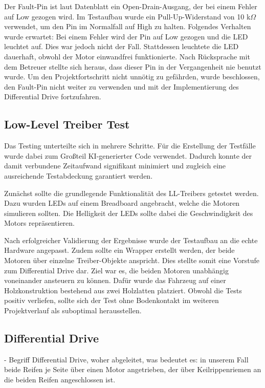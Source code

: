 Der Fault-Pin ist laut Datenblatt ein Open-Drain-Ausgang, der bei einem Fehler auf Low gezogen wird. Im Testaufbau wurde ein Pull-Up-Widerstand von 10 k$\Omega$ verwendet, um den Pin im Normalfall auf High zu halten. Folgendes Verhalten wurde erwartet: Bei einem Fehler wird der Pin auf Low gezogen und die LED leuchtet auf. Dies war jedoch nicht der Fall. Stattdessen leuchtete die LED dauerhaft, obwohl der Motor einwandfrei funktionierte. Nach Rücksprache mit dem Betreuer stellte sich heraus, dass dieser Pin in der Vergangenheit nie benutzt wurde. Um den Projektfortschritt nicht unnötig zu gefährden, wurde beschlossen, den Fault-Pin nicht weiter zu verwenden und mit der Implementierung des Differential Drive fortzufahren.

\subsection{Low-Level Treiber Test}

Das Testing unterteilte sich in mehrere Schritte. Für die Erstellung der Testfälle wurde dabei zum Großteil KI-generierter Code verwendet. Dadurch konnte der damit verbundene Zeitaufwand signifikant minimiert und zugleich eine ausreichende Testabdeckung garantiert werden. \newline

Zunächst sollte die grundlegende Funktionalität des LL-Treibers getestet werden. Dazu wurden LEDs auf einem Breadboard angebracht, welche die Motoren simulieren sollten. Die Helligkeit der LEDs sollte dabei die Geschwindigkeit des Motors repräsentieren. \newline

Nach erfolgreicher Validierung der Ergebnisse wurde der Testaufbau an die echte Hardware angepasst. Zudem sollte ein Wrapper erstellt werden, der beide Motoren über einzelne Treiber-Objekte anspricht. Dies stellte somit eine Vorstufe zum Differential Drive dar. Ziel war es, die beiden Motoren unabhängig voneinander ansteuern zu können. Dafür wurde das Fahrzeug auf einer Holzkonstruktion bestehend aus zwei Holzlatten platziert. Obwohl die Tests positiv verliefen, sollte sich der Test ohne Bodenkontakt im weiteren Projektverlauf als suboptimal herausstellen.

\subsection{Differential Drive}

- Begriff Differential Drive, woher abgeleitet, was bedeutet es: in unserem Fall beide Reifen je Seite über einen Motor angetrieben, der über Keilrippenriemen an die beiden Reifen angeschlossen ist.

